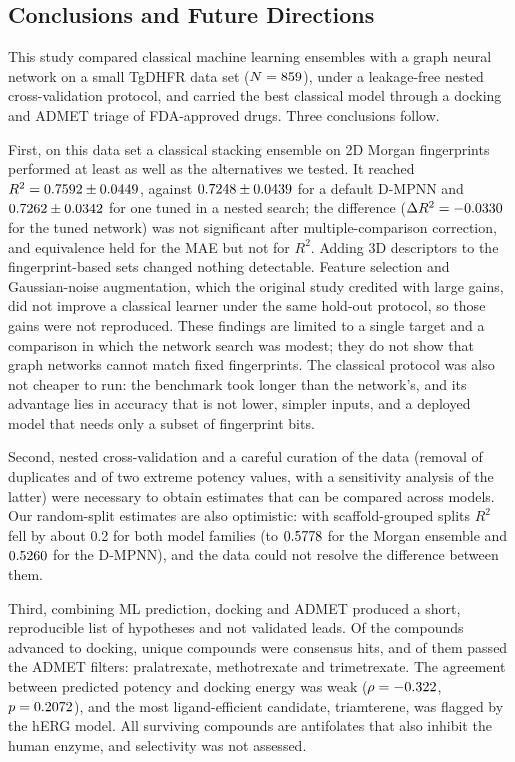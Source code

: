 \subsection{Conclusions and Future Directions}

This study compared classical machine learning ensembles with a graph neural network on a small TgDHFR data set ($N = 859$), under a leakage-free nested cross-validation protocol, and carried the best classical model through a docking and ADMET triage of FDA-approved drugs. Three conclusions follow.

First, on this data set a classical stacking ensemble on 2D Morgan fingerprints performed at least as well as the alternatives we tested. It reached $R^2 = 0.7592 \pm 0.0449$, against $0.7248 \pm 0.0439$ for a default D-MPNN and $0.7262 \pm 0.0342$ for one tuned in a nested search; the difference ($\Delta R^2 = -0.0330$ for the tuned network) was not significant after multiple-comparison correction, and equivalence held for the MAE but not for $R^2$. Adding 3D descriptors to the fingerprint-based sets changed nothing detectable. Feature selection and Gaussian-noise augmentation, which the original study credited with large gains, did not improve a classical learner under the same hold-out protocol, so those gains were not reproduced. These findings are limited to a single target and a comparison in which the network search was modest; they do not show that graph networks cannot match fixed fingerprints. The classical protocol was also not cheaper to run: the benchmark took longer than the network's, and its advantage lies in accuracy that is not lower, simpler inputs, and a deployed model that needs only a subset of fingerprint bits.

Second, nested cross-validation and a careful curation of the data (removal of duplicates and of two extreme potency values, with a sensitivity analysis of the latter) were necessary to obtain estimates that can be compared across models. Our random-split estimates are also optimistic: with scaffold-grouped splits $R^2$ fell by about 0.2 for both model families (to $0.5778$ for the Morgan ensemble and $0.5260$ for the D-MPNN), and the data could not resolve the difference between them.

Third, combining ML prediction, docking and ADMET produced a short, reproducible list of hypotheses and not validated leads. Of the \ScreenNCandidates{} compounds advanced to docking, \AdmetNConsensus{} unique compounds were consensus hits, and \AdmetNConsensusSurvivors{} of them passed the ADMET filters: pralatrexate, methotrexate and trimetrexate. The agreement between predicted potency and docking energy was weak ($\rho = -0.322$, $p = 0.2072$), and the most ligand-efficient candidate, triamterene, was flagged by the hERG model. All surviving compounds are antifolates that also inhibit the human enzyme, and selectivity was not assessed.

